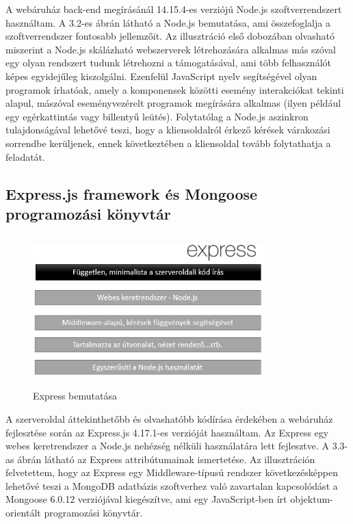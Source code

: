 A webáruház back-end megírásánál 14.15.4-es verziójú Node.js szoftverrendszert használtam. A 3.2-es ábrán látható a Node.js bemutatása, ami összefoglalja a szoftverrendszer fontosabb jellemzőit. Az illusztráció első dobozában olvasható miszerint a Node.js skálázható webszerverek létrehozására alkalmas más szóval egy olyan rendszert tudunk létrehozni a támogatásával, ami több felhasználót képes egyidejűleg kiszolgálni. Ezenfelül JavaScript nyelv segítségével olyan programok írhatóak, amely a komponensek közötti esemény interakciókat tekinti alapul, mászóval eseményvezérelt programok megírására alkalmas (ilyen például egy egérkattintás vagy billentyű leütés). Folytatólag a Node.js aszinkron tulajdonságával lehetővé teszi, hogy a kliensoldalról érkező kérések várakozási sorrendbe kerüljenek, ennek következtében a kliensoldal tovább folytathatja a feladatát. 

\subsection{Express.js framework és Mongoose programozási könyvtár}

\begin{figure}[H]
	\centering
	\includegraphics[width=0.8\textwidth,height=220px]{images/express_bemutatasa.png}
	\caption{Express bemutatása}
	\label{fig.picture-4}
\end{figure}

A szerveroldal áttekinthetőbb és olvashatóbb kódírása érdekében a webáruház fejlesztése során az Express.js 4.17.1-es verzióját használtam. Az Express egy webes keretrendszer a Node.js nehézség nélküli használatára lett fejlesztve. A 3.3-as ábrán látható az Express attribútumainak ismertetése. Az illusztráción felvetettem, hogy az Express egy Middleware-típusú rendszer következésképpen lehetővé teszi a MongoDB adatbázis szoftverhez való zavartalan kapcsolódást a Mongoose 6.0.12 verziójával kiegészítve, ami egy JavaScript-ben írt objektum-orientált programozási könyvtár.

